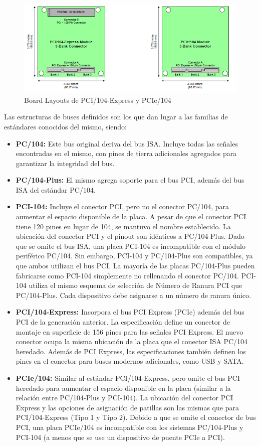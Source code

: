 \begin{figure}
    \centering
    \includegraphics[width=\textwidth]{Img/pci104threebank}
    \caption{Board Layouts de PCI/104-Express y PCIe/104}
    \label{fig:pci104threebank}
\end{figure}

Las estructuras de buses definidos son los que dan lugar a las familias de estándares conocidos del mismo, siendo:

\begin{itemize}
    \item \textbf{PC/104:} Este bus original deriva del bus ISA. Incluye todas las señales encontradas en el mismo, con pines de tierra adicionales agregados para garantizar la integridad del bus.
    \item \textbf{PC/104-Plus:} El mismo agrega soporte para el bus PCI, además del bus ISA del estándar PC/104.
    \item \textbf{PCI-104:} Incluye el conector PCI, pero no el conector PC/104, para aumentar el espacio disponible de la placa. A pesar de que el conector PCI tiene 120 pines en lugar de 104, se mantuvo el nombre establecido. La ubicación del conector PCI y el pinout son idénticos a PC/104-Plus. Dado que se omite el bus ISA, una placa PCI-104 es incompatible con el módulo periférico PC/104. Sin embargo, PCI-104 y PC/104-Plus son compatibles, ya que ambos utilizan el bus PCI. La mayoría de las placas PC/104-Plus pueden fabricarse como PCI-104 simplemente no rellenando el conector PC/104. PCI-104 utiliza el mismo esquema de selección de Número de Ranura PCI que PC/104-Plus. Cada dispositivo debe asignarse a un número de ranura único.
    \item \textbf{PCI/104-Express:} Incorpora el bus PCI Express (PCIe) además del bus PCI de la generación anterior. La especificación define un conector de montaje en superficie de 156 pines para las señales PCI Express. El nuevo conector ocupa la misma ubicación de la placa que el conector ISA PC/104 heredado. Además de PCI Express, las especificaciones también definen los pines en el conector para buses modernos adicionales, como USB y SATA.
    \item \textbf{PCIe/104:} Similar al estándar PCI/104-Express, pero omite el bus PCI heredado para aumentar el espacio disponible en la placa (similar a la relación entre PC/104-Plus y PCI-104). La ubicación del conector PCI Express y las opciones de asignación de patillas son las mismas que para PCI/104-Express (Tipo 1 y Tipo 2). Debido a que se omite el conector de bus PCI, una placa PCIe/104 es incompatible con los sistemas PC/104-Plus y PCI-104 (a menos que se use un dispositivo de puente PCIe a PCI).
\end{itemize}

